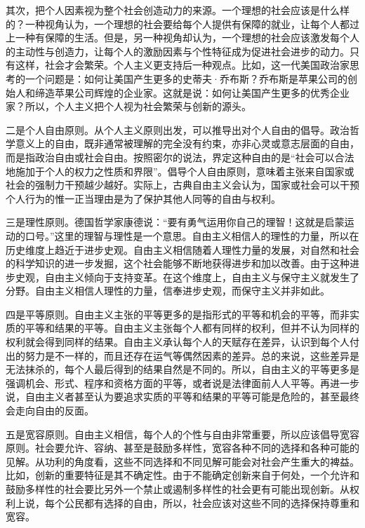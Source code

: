 其次，把个人因素视为整个社会创造动力的来源。一个理想的社会应该是什么样的？一种视角认为，一个理想的社会要给每个人提供有保障的就业，让每个人都过上一种有保障的生活。但是，另一种视角却认为，一个理想的社会应该激发每个人的主动性与创造力，让每个人的激励因素与个性特征成为促进社会进步的动力。只有这样，社会才会繁荣。个人主义更支持后一种观点。比如，这一代美国政治家思考的一个问题是：如何让美国产生更多的史蒂夫·乔布斯？乔布斯是苹果公司的创始人和缔造苹果公司辉煌的企业家。这就是说：如何让美国产生更多的优秀企业家？所以，个人主义把个人视为社会繁荣与创新的源头。

二是个人自由原则。从个人主义原则出发，可以推导出对个人自由的倡导。政治哲学意义上的自由，既非通常被理解的完全没有约束，亦非心灵或意志层面的自由，而是指政治自由或社会自由。按照密尔的说法，界定这种自由的是“社会可以合法地施加于个人的权力之性质和界限”。倡导个人自由原则，意味着主张来自国家或社会的强制力干预越少越好。实际上，古典自由主义会认为，国家或社会可以干预个人行为的惟一正当理由是为了保护其他人同等的自由与权利。

三是理性原则。德国哲学家康德说：“要有勇气运用你自己的理智！这就是启蒙运动的口号。”这里的理智与理性是一个意思。自由主义相信人的理性的力量，所以在历史维度上趋近于进步史观。自由主义相信随着人理性力量的发展，对自然和社会的科学知识的进一步发掘，这个社会能够不断地获得进步和加以改善。由于这种进步史观，自由主义倾向于支持变革。在这个维度上，自由主义与保守主义就发生了分野。自由主义相信人理性的力量，信奉进步史观，而保守主义并非如此。

四是平等原则。自由主义主张的平等更多的是指形式的平等和机会的平等，而非实质的平等和结果的平等。自由主义主张每个人都有同样的权利，但并不认为同样的权利就会得到同样的结果。自由主义承认每个人的天赋存在差异，认识到每个人付出的努力是不一样的，而且还存在运气等偶然因素的差异。总的来说，这些差异是无法抹杀的，每个人最后得到的结果自然是不同的。所以，自由主义的平等更多是强调机会、形式、程序和资格方面的平等，或者说是法律面前人人平等。再进一步说，自由主义者甚至认为要追求实质的平等和结果的平等可能是危险的，甚至最终会走向自由的反面。

五是宽容原则。自由主义相信，每个人的个性与自由非常重要，所以应该倡导宽容原则。社会要允许、容纳、甚至是鼓励多样性，宽容各种不同的选择和各种可能的见解。从功利的角度看，这些不同选择和不同见解可能会对社会产生重大的裨益。比如，创新的重要特征是其不确定性。由于不能确定创新来自于何处，一个允许和鼓励多样性的社会要比另外一个禁止或遏制多样性的社会更有可能出现创新。从权利上说，每个公民都有选择的自由，所以，社会应该对这些不同的选择保持尊重和宽容。

